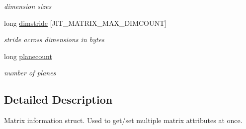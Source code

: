 \begin{DoxyCompactItemize}
\begin{DoxyCompactList}\small\item\em dimension sizes \item\end{DoxyCompactList}\item 
\hypertarget{structt__jit__matrix__info_a1fa371b72de180c778c382e2b3286b2f}{
long \hyperlink{structt__jit__matrix__info_a1fa371b72de180c778c382e2b3286b2f}{dimstride} \mbox{[}JIT\_\-MATRIX\_\-MAX\_\-DIMCOUNT\mbox{]}}
\label{structt__jit__matrix__info_a1fa371b72de180c778c382e2b3286b2f}

\begin{DoxyCompactList}\small\item\em stride across dimensions in bytes \item\end{DoxyCompactList}\item 
\hypertarget{structt__jit__matrix__info_a4f8e32123477684b18c83ca3d9079803}{
long \hyperlink{structt__jit__matrix__info_a4f8e32123477684b18c83ca3d9079803}{planecount}}
\label{structt__jit__matrix__info_a4f8e32123477684b18c83ca3d9079803}

\begin{DoxyCompactList}\small\item\em number of planes \item\end{DoxyCompactList}\end{DoxyCompactItemize}


\subsection{Detailed Description}
Matrix information struct. Used to get/set multiple matrix attributes at once. 